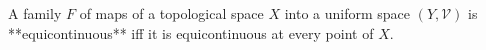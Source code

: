 A family $F$ of maps of a topological space $X$ into a uniform space $(Y, \mathcal{V})$ is **equicontinuous** iff it is equicontinuous at every point of $X$.
